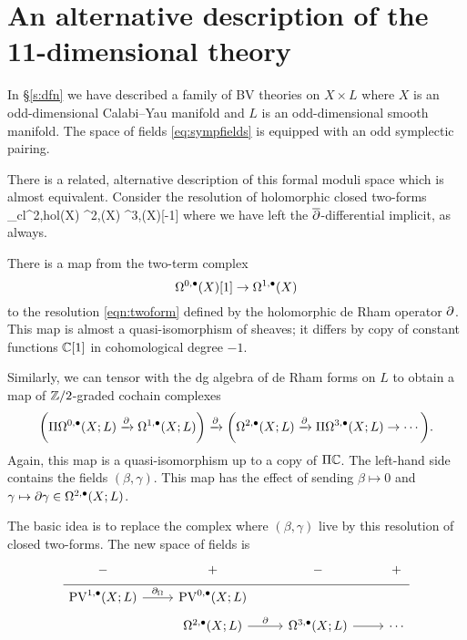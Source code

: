\documentclass[11pt]{amsart}
\begin{document}
\appendix 

\section{An alternative description of the 11-dimensional theory} 
In \S \ref{s:dfn} we have described a family of BV theories on $X \times L$ where $X$ is an odd-dimensional Calabi--Yau manifold and $L$ is an odd-dimensional smooth manifold. 
The space of fields \eqref{eq:sympfields} is equipped with an odd symplectic pairing. 


There is a related, alternative description of this formal moduli space which is almost equivalent. 
Consider the resolution of holomorphic closed two-forms 
\beqn\label{eqn:twoform}
\Omega_{cl}^{2,hol}(X) \simeq \Omega^{2,\bu}(X) \xto{\del} \Omega^{3,\bu}(X)[-1] \to \cdots 
\eeqn
where we have left the $\overline{\partial}$-differential implicit, as always. 

There is a map from the two-term complex 
\[
\Omega^{0,\bullet}(X)[1] \to \Omega^{1,\bullet}(X)
\]
to the resolution \eqref{eqn:twoform} defined by the holomorphic de Rham operator $\partial$. 
This map is almost a quasi-isomorphism of sheaves; it differs by copy of constant functions $\mathbb C[1]$ in cohomological degree $-1$. 

Similarly, we can tensor with the dg algebra of de Rham forms on $L$ to obtain a map of $\mathbb Z/2$-graded cochain complexes
\[
\bigg(\Pi \Omega^{0,\bullet}(X;L) \xrightarrow{\partial} \Omega^{1,\bullet}(X;L) \bigg) \xrightarrow{\partial} \bigg(\Omega^{2,\bullet}(X;L) \xrightarrow{\partial} \Pi \Omega^{3,\bullet}(X;L) \to \cdots \bigg) .
\]
Again, this map is a quasi-isomorphism up to a copy of $\Pi \mathbb C$.
The left-hand side contains the fields $(\beta, \gamma)$. 
This map has the effect of sending $\beta \mapsto 0$ and $\gamma \mapsto \partial \gamma \in \Omega^{2,\bullet}(X;L)$. 

The basic idea is to replace the complex where $(\beta,\gamma)$ live by this resolution of closed two-forms. 
The new space of fields is 
\begin{equation}
  \label{eq:poissfields} 
  \begin{tikzcd}[row sep = 1 ex]
     - & + & - & + \\ \hline
     \PV^{1,\bu}(X; L) \ar[r, "\div"] & \PV^{0,\bu}(X; L) \\
     & \Omega^{2,\bu}(X;L) \ar[r, "\del"] & \Omega^{3,\bu}(X;L) \ar[r] & \cdots 
\end{tikzcd}
\end{equation}
\end{document}
